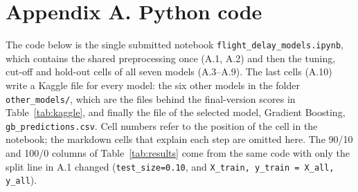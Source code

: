 \documentclass[12pt,a4paper]{article}
\newcommand{\code}[1]{\texttt{\small #1}}
\begin{document}
\clearpage
\appendix
\section*{Appendix A. Python code}
\small The code below is the single submitted notebook \code{flight\_delay\_models.ipynb}, which contains the shared preprocessing once (A.1, A.2) and then the tuning, cut-off and hold-out cells of all seven models (A.3--A.9). The last cells (A.10) write a Kaggle file for every model: the six other models in the folder \code{other\_models/}, which are the files behind the final-version scores in Table~\ref{tab:kaggle}, and finally the file of the selected model, Gradient Boosting, \code{gb\_predictions.csv}. Cell numbers refer to the position of the cell in the notebook; the markdown cells that explain each step are omitted here. The 90/10 and 100/0 columns of Table~\ref{tab:results} come from the same code with only the split line in A.1 changed (\code{test\_size=0.10}, and \code{X\_train, y\_train = X\_all, y\_all}).
\end{document}
